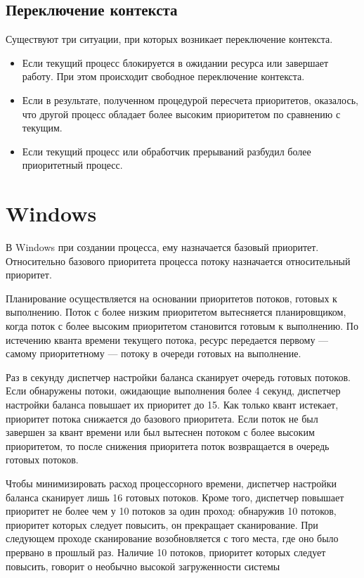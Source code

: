         \subsection{Переключение контекста}
        
            Существуют  три  ситуации,  при  которых  возникает  переключение  контекста. 
            
            \begin{itemize}
                \item Если  текущий  процесс  блокируется  в  ожидании  ресурса  или  завершает  работу.  При  этом  происходит  свободное  переключение  контекста. 
                \item Если  в  результате,  полученном  процедурой  пересчета  приоритетов,  оказалось,  что  другой  процесс  обладает  более  высоким  приоритетом  по  сравнению  с  текущим. 
                \item Если  текущий  процесс  или  обработчик  прерываний  разбудил  более  приоритетный  процесс.
            \end{itemize}

    \section{Windows}
    
        В Windows при создании процесса, ему назначается базовый приоритет. Относительно базового приоритета процесса потоку назначается относительный приоритет.
        
        Планирование осуществляется на основании приоритетов потоков, готовых к выполнению. Поток с более низким приоритетом вытесняется планировщиком, когда поток с более высоким приоритетом становится готовым к выполнению. По истечению кванта времени текущего потока, ресурс передается первому — самому приоритетному — потоку в очереди готовых на выполнение.
        
        Раз в секунду диспетчер настройки баланса сканирует очередь готовых потоков. Если обнаружены потоки, ожидающие выполнения более 4 секунд, диспетчер настройки баланса повышает их приоритет до 15. Как только квант истекает, приоритет потока снижается до базового приоритета. Если поток не был завершен за квант времени или был вытеснен потоком с более высоким приоритетом, то после снижения приоритета поток возвращается в очередь готовых потоков.
        
        Чтобы минимизировать расход процессорного времени, диспетчер настройки баланса сканирует лишь 16 готовых потоков. Кроме того, диспетчер повышает приоритет не более чем у 10 потоков за один проход: обнаружив 10 потоков, приоритет которых следует повысить, он прекращает сканирование. При следующем проходе сканирование возобновляется с того места, где оно было прервано в прошлый раз. Наличие 10 потоков, приоритет которых следует повысить, говорит о необычно высокой загруженности системы
        
